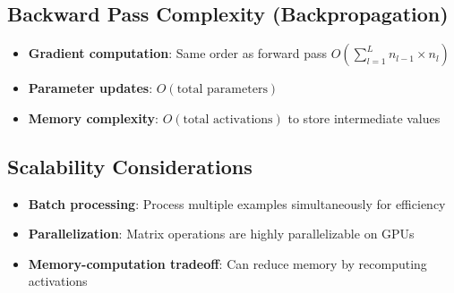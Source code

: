 \subsection{Backward Pass Complexity (Backpropagation)}
\begin{itemize}
    \item \textbf{Gradient computation}: Same order as forward pass \(O(\sum_{l=1}^{L} n_{l-1} \times n_l)\)
    \item \textbf{Parameter updates}: \(O(\text{total parameters})\)
    \item \textbf{Memory complexity}: \(O(\text{total activations})\) to store intermediate values
\end{itemize}

\subsection{Scalability Considerations}
\begin{itemize}
    \item \textbf{Batch processing}: Process multiple examples simultaneously for efficiency
    \item \textbf{Parallelization}: Matrix operations are highly parallelizable on GPUs
    \item \textbf{Memory-computation tradeoff}: Can reduce memory by recomputing activations
\end{itemize}
